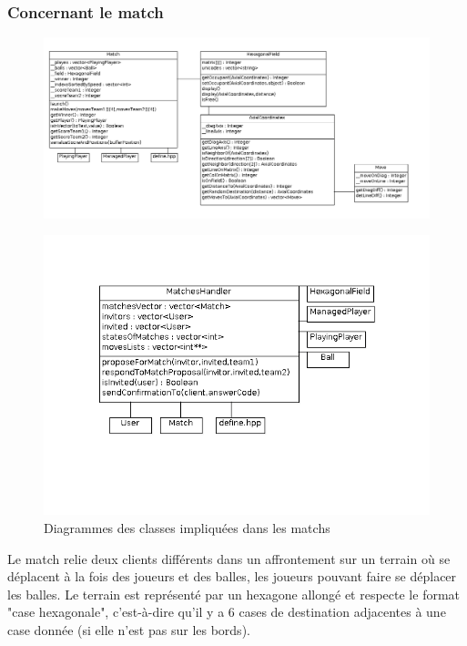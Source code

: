 \documentclass[a4paper,titlepage]{scrreprt}
\begin{document}
  \subsubsection{Concernant le match}
    \begin{figure}[H]
    \center
    \includegraphics[scale=0.4]{uml/class/Match.png}
    \end{figure}	
    \begin{figure}[H]
    \center
    \includegraphics[scale=0.4]{uml/class/MatchesHandler.png}
    \caption{Diagrammes des classes impliquées dans les matchs}
    \end{figure}	
    Le match relie deux clients différents dans un affrontement sur un \gls{terrain} 
    où se déplacent à la fois des joueurs et des balles, les joueurs pouvant faire se déplacer les balles. Le terrain est représenté par un hexagone allongé et respecte le format "case hexagonale", c'est-à-dire qu'il y a 6 cases de destination adjacentes à une case donnée (si elle n'est pas sur les bords).
\end{document}
